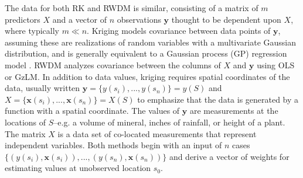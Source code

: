 
The data for both RK and RWDM is similar, consisting of a matrix of $m$ predictors $X$ and a vector of $n$ observations $\bm{y}$ thought to be dependent upon $X$, where typically $m \ll n$.  Kriging models covariance between data points of $\bm{y}$, assuming these are realizations of random variables with a multivariate Gaussian distribution, and is generally equivalent to a Gaussian process (GP) regression model \citep{rasmussen06}.  RWDM analyzes covariance between the columns of $X$ and $\bm{y}$ using OLS or GzLM.  In addition to data values, kriging requires spatial coordinates of the data, usually written $\bm{y}=\{y(s_i), ..., y(s_n)\}=y(S)$ and $X=\{\bm{x}(s_i), ..., \bm{x}(s_n)\}=X(S)$ to emphasize that the data is generated by a function with a spatial coordinate.  The values of $\bm{y}$ are measurements at the locations of $S$--e.g. a volume of mineral, inches of rainfall, or height of a plant.  The matrix $X$ is a data set of co-located measurements that represent independent variables.  Both methods begin with an input of $n$ cases $\{(y(s_i), \bm{x}(s_i)), ..., (y(s_n), \bm{x}(s_n))\}$ and derive a vector of weights for estimating values at unobserved location $s_0$.

